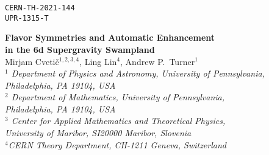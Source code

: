 \documentclass[11pt, a4paper]{article}
\begin{document}
\baselineskip=18pt  %
\allowdisplaybreaks  %



\thispagestyle{empty}

\vspace*{-2cm}
\begin{flushright}
	\texttt{CERN-TH-2021-144} \\
	\texttt{UPR-1315-T}
\end{flushright}

\vspace*{0.6cm}
\begin{center}
{\LARGE{\textbf{Flavor Symmetries and Automatic Enhancement \vspace{.2cm}\\
in the 6d Supergravity Swampland}}} \\
 \vspace*{1.5cm}
Mirjam Cveti{\v c}$^{1,2,3,4}$, Ling Lin$^{4}$, Andrew P.~Turner$^{1}$\\

 \vspace*{1.0cm}
{\it ${}^1$ Department of Physics and Astronomy, University of Pennsylvania,\\
Philadelphia, PA 19104, USA\\
\it ${}^2$ Department of Mathematics, University of Pennsylvania,\\
Philadelphia, PA 19104, USA\\
${}^3$ Center for Applied Mathematics and Theoretical Physics,\\
University of Maribor, SI20000 Maribor, Slovenia\\
${}^4$CERN Theory Department, CH-1211 Geneva, Switzerland\\}


\vspace*{0.8cm}
\end{center}
\vspace*{.5cm}
\end{document}
